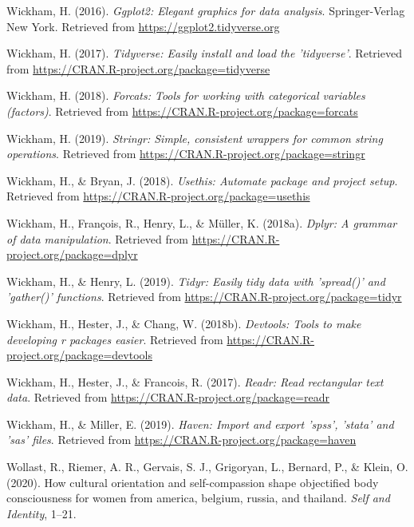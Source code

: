 \documentclass[
  man]{apa6}
\begin{document}
\leavevmode\hypertarget{ref-R-ggplot2}{}%
Wickham, H. (2016). \emph{Ggplot2: Elegant graphics for data analysis}. Springer-Verlag New York. Retrieved from \url{https://ggplot2.tidyverse.org}

\leavevmode\hypertarget{ref-R-tidyverse}{}%
Wickham, H. (2017). \emph{Tidyverse: Easily install and load the 'tidyverse'}. Retrieved from \url{https://CRAN.R-project.org/package=tidyverse}

\leavevmode\hypertarget{ref-R-forcats}{}%
Wickham, H. (2018). \emph{Forcats: Tools for working with categorical variables (factors)}. Retrieved from \url{https://CRAN.R-project.org/package=forcats}

\leavevmode\hypertarget{ref-R-stringr}{}%
Wickham, H. (2019). \emph{Stringr: Simple, consistent wrappers for common string operations}. Retrieved from \url{https://CRAN.R-project.org/package=stringr}

\leavevmode\hypertarget{ref-R-usethis}{}%
Wickham, H., \& Bryan, J. (2018). \emph{Usethis: Automate package and project setup}. Retrieved from \url{https://CRAN.R-project.org/package=usethis}

\leavevmode\hypertarget{ref-R-dplyr}{}%
Wickham, H., François, R., Henry, L., \& Müller, K. (2018a). \emph{Dplyr: A grammar of data manipulation}. Retrieved from \url{https://CRAN.R-project.org/package=dplyr}

\leavevmode\hypertarget{ref-R-tidyr}{}%
Wickham, H., \& Henry, L. (2019). \emph{Tidyr: Easily tidy data with 'spread()' and 'gather()' functions}. Retrieved from \url{https://CRAN.R-project.org/package=tidyr}

\leavevmode\hypertarget{ref-R-devtools}{}%
Wickham, H., Hester, J., \& Chang, W. (2018b). \emph{Devtools: Tools to make developing r packages easier}. Retrieved from \url{https://CRAN.R-project.org/package=devtools}

\leavevmode\hypertarget{ref-R-readr}{}%
Wickham, H., Hester, J., \& Francois, R. (2017). \emph{Readr: Read rectangular text data}. Retrieved from \url{https://CRAN.R-project.org/package=readr}

\leavevmode\hypertarget{ref-R-haven}{}%
Wickham, H., \& Miller, E. (2019). \emph{Haven: Import and export 'spss', 'stata' and 'sas' files}. Retrieved from \url{https://CRAN.R-project.org/package=haven}

\leavevmode\hypertarget{ref-wollast2020cultural}{}%
Wollast, R., Riemer, A. R., Gervais, S. J., Grigoryan, L., Bernard, P., \& Klein, O. (2020). How cultural orientation and self-compassion shape objectified body consciousness for women from america, belgium, russia, and thailand. \emph{Self and Identity}, 1--21.
\end{document}
